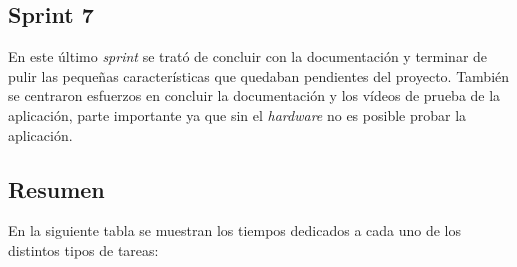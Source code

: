 
\subsection{Sprint 7}

En este último \emph{sprint} se trató de concluir con la documentación y terminar de pulir las pequeñas características que quedaban pendientes del proyecto. También se centraron esfuerzos en concluir la documentación y los vídeos de prueba de la aplicación, parte importante ya que sin el \emph{hardware} no es posible probar la aplicación.


\subsection{Resumen}

En la siguiente tabla se muestran los tiempos dedicados a cada uno de los distintos tipos de tareas:



